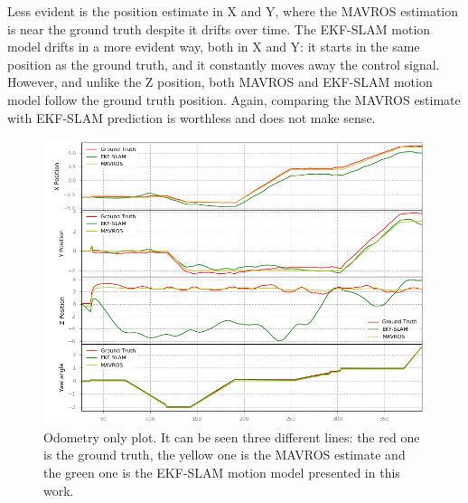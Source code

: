 Less evident is the position estimate in X and Y, where the MAVROS estimation is near the ground truth despite it drifts over time. The EKF-SLAM motion model drifts in a more evident way, both in X and Y: it starts in the same position as the ground truth, and it constantly moves away the control signal. However, and unlike the Z position, both MAVROS and EKF-SLAM motion model follow the ground truth position. Again, comparing the MAVROS estimate with EKF-SLAM prediction is worthless and does not make sense.
\begin{figure}
    \centering
    \includegraphics[width=\textwidth]{Images/fig19-odom_only}
    \caption[Odometry only plot]{Odometry only plot. It can be seen three different lines: the red one is the ground truth, the yellow one is the MAVROS estimate and the green one is the EKF-SLAM motion model presented in this work.}
    \label{fig:chapter3:odom-only}
\end{figure}

